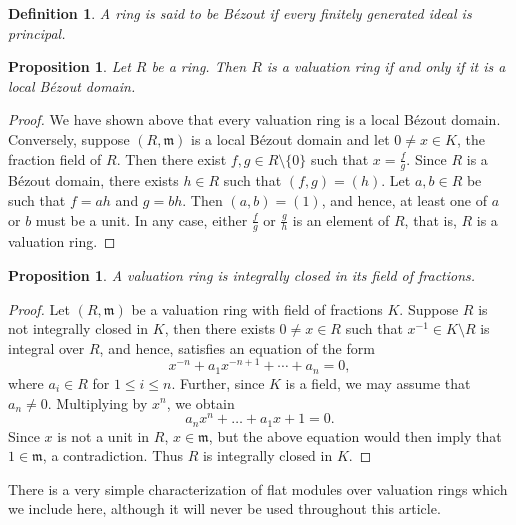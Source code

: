 \documentclass[11pt]{article}
\theoremstyle{thmstyle}
\newtheorem{proposition}[theorem]{Proposition}
\theoremstyle{defstyle}
\newtheorem{definition}[theorem]{Definition}
\newcommand{\frakm}{\mathfrak{m}} %
\renewcommand{\le}{\leqslant}
\begin{document}
\begin{definition}
    A ring is said to be B\'ezout if every finitely generated ideal is principal.
\end{definition}

\begin{proposition}
    Let $R$ be a ring. Then $R$ is a valuation ring if and only if it is a local B\'ezout domain.
\end{proposition}
\begin{proof}
    We have shown above that every valuation ring is a local B\'ezout domain. Conversely, suppose $(R,\frakm)$ is a local B\'ezout domain and let $0\ne x\in K$, the fraction field of $R$. Then there exist $f, g\in R\setminus\{0\}$ such that $x = \frac{f}{g}$. Since $R$ is a B\'ezout domain, there exists $h\in R$ such that $(f, g) = (h)$. Let $a, b\in R$ be such that $f = ah$ and $g = bh$. Then $(a, b) = (1)$, and hence, at least one of $a$ or $b$ must be a unit. In any case, either $\frac{f}{g}$ or $\frac{g}{h}$ is an element of $R$, that is, $R$ is a valuation ring.
\end{proof}

\begin{proposition}
    A valuation ring is integrally closed in its field of fractions.
\end{proposition}
\begin{proof}
    Let $(R,\frakm)$ be a valuation ring with field of fractions $K$. Suppose $R$ is not integrally closed in $K$, then there exists $0\ne x\in R$ such that $x^{-1}\in K\setminus R$ is integral over $R$, and hence, satisfies an equation of the form 
    \begin{equation*}
        x^{-n} + a_{1}x^{-n + 1} + \cdots + a_n = 0,
    \end{equation*}
    where $a_i\in R$ for $1\le i\le n$. Further, since $K$ is a field, we may assume that $a_n\ne 0$. Multiplying by $x^n$, we obtain 
    \begin{equation*}
        a_nx^n + \dots + a_1x + 1 = 0.
    \end{equation*}
    Since $x$ is not a unit in $R$, $x\in\frakm$, but the above equation would then imply that $1\in\frakm$, a contradiction. Thus $R$ is integrally closed in $K$.
\end{proof}

There is a very simple characterization of flat modules over valuation rings which we include here, although it will never be used throughout this article.
\end{document}
